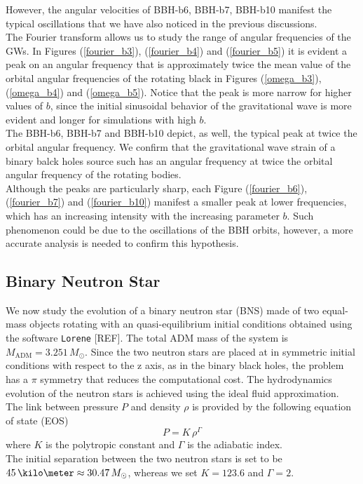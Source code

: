 However, the angular velocities of BBH-b6, BBH-b7, BBH-b10 manifest the typical oscillations that we have also noticed in the previous discussions.\\
The Fourier transform allows us to study the range of angular frequencies of the GWs.
In Figures (\ref{fourier_b3}), (\ref{fourier_b4}) and (\ref{fourier_b5}) it is evident a peak on an angular frequency that is approximately twice the mean value of the orbital angular frequencies of the rotating black in Figures (\ref{omega_b3}), (\ref{omega_b4}) and (\ref{omega_b5}).
Notice that the peak is more narrow for higher values of $b$, since the initial sinusoidal behavior of the gravitational wave is more evident and longer for simulations with high $b$.\\
The BBH-b6, BBH-b7 and BBH-b10 depict, as well, the typical peak at twice the orbital angular frequency.
We confirm that the gravitational wave strain of a binary balck holes source such has an angular frequency at twice the orbital angular frequency of the rotating bodies.\\
Although the peaks are particularly sharp,  each Figure (\ref{fourier_b6}), (\ref{fourier_b7}) and (\ref{fourier_b10}) manifest a smaller peak at lower frequencies, which has an increasing intensity with the increasing parameter $b$.
Such phenomenon could be due to the oscillations of the BBH orbits, however, a more accurate analysis is needed to confirm this hypothesis.\\

\pagebreak

\subsection{Binary Neutron Star}
We now study the evolution of a binary neutron star (BNS) made of two equal-mass objects rotating with an quasi-equilibrium initial conditions obtained using the software \texttt{Lorene} [REF].
The total ADM mass of the system is $M_{\text{ADM}} = 3.251 \, M_{\odot}$.
Since the two neutron stars are placed at in symmetric initial conditions with respect to the z axis, as in the binary black holes, the problem has a $\pi$ symmetry that reduces the computational cost.
The hydrodynamics evolution of the neutron stars is achieved using the ideal fluid approximation. 
The link between pressure $P$ and density $\rho$ is provided by the following equation of state (EOS)
\[
P = K \, \rho ^{\Gamma}
\]
where $K$ is the polytropic constant and $\Gamma$ is the adiabatic index.\\
The initial separation between the two neutron stars is set to be $45 \, \kilo \meter \approx 30.47 \, M_{\odot}$, whereas we set $K=123.6$ and $\Gamma=2$.\\

